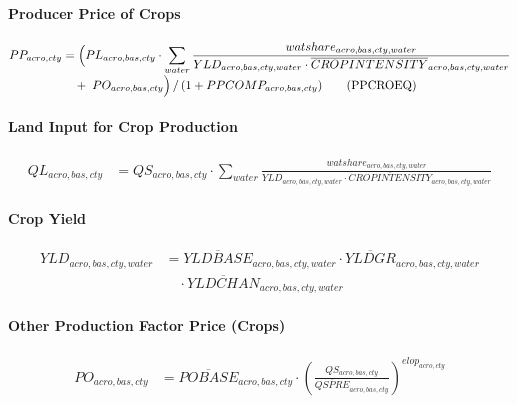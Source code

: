 \paragraph{Producer Price of Crops}
\begin{align}
  PP_{acro,cty}
  &= \Bigl(
      PL_{acro,bas,cty}
      \cdot
      \sum_{water}
      \frac{
        watshare_{acro,bas,cty,water}
      }{
        YLD_{acro,bas,cty,water}
        \cdot
        \overline{CROPINTENSITY}_{acro,bas,cty,water}
      }
      \nonumber\\[-0.3em]
  &\quad
      +\; PO_{acro,bas,cty}
     \Bigl)
     \,/\, (1 + PPCOMP_{acro,bas,cty})
  \tag{PPCROEQ}\label{eq:PPCROEQ}
\end{align}

\paragraph{Land Input for Crop Production}
\begin{align}
  QL_{acro,bas,cty}
  &= QS_{acro,bas,cty}
     \cdot
     \sum_{water}
     \frac{
       watshare_{acro,bas,cty,water}
     }{
       YLD_{acro,bas,cty,water}
       \cdot
       \overline{CROPINTENSITY}_{acro,bas,cty,water}
     }
  \tag{QLCROINPUTEQ}\label{eq:QLCROINPUTEQ}
\end{align}

\paragraph{Crop Yield}
\begin{align}
  YLD_{acro,bas,cty,water}
  &= \overline{YLDBASE}_{acro,bas,cty,water}
     \cdot
     \overline{YLDGR}_{acro,bas,cty,water}
     \nonumber\\
  &\quad
     \cdot
     \overline{YLDCHAN}_{acro,bas,cty,water}
  \tag{YLDEQ}\label{eq:YLDEQ}
\end{align}

\paragraph{Other Production Factor Price (Crops)}
\begin{align}
  PO_{acro,bas,cty}
  &= \overline{POBASE}_{acro,bas,cty}
     \cdot
     \left(
       \frac{QS_{acro,bas,cty}}
            {\overline{QSPRE}_{acro,bas,cty}}
     \right)^{elop_{acro,cty}}
  \tag{POCROEQ}\label{eq:POCROEQ}
\end{align}


